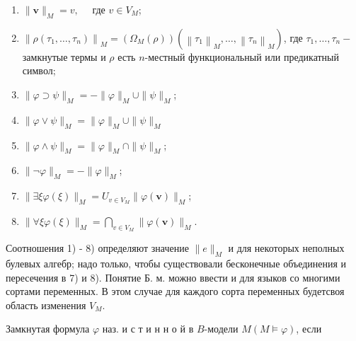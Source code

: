 \documentclass[10pt]{article}
\begin{document}
\begin{enumerate}

  \item $\|\boldsymbol{v}\|_{M}=v, \quad$ где $v \in V_{M}$;



  \item $\left\|\rho\left(\tau_{1}, \ldots, \tau_{n}\right)\right\|_{M}=\left(\Omega_{M}(\rho)\right)\left(\left\|\tau_{1}\right\|_{M}, \ldots,\left\|\tau_{n}\right\|_{M}\right)$, где $\tau_{1}, \ldots, \tau_{n}-$ замкнутые термы и $\rho$ есть $n$-местный функциональный или предикатный символ;



  \item $\|\varphi \supset \psi\|_{M}=-\|\varphi\|_{M} \cup\|\psi\|_{M}$;



  \item $\|\varphi \vee \psi\|_{M}=\|\varphi\|_{M} \cup\|\psi\|_{M}$



  \item $\|\varphi \wedge \psi\|_{M}=\|\varphi\|_{M} \cap\|\psi\|_{M}$;



  \item $\|\neg \varphi\|_{M}=-\|\varphi\|_{M}$;



  \item $\|\exists \xi \varphi(\xi)\|_{M}=U_{v \in V_{M}}\|\varphi(\boldsymbol{v})\|_{M}$;



  \item $\|\forall \xi \varphi(\xi)\|_{M}=\bigcap_{v \in V_{M}}\|\varphi(\boldsymbol{v})\|_{M}$.



\end{enumerate}



Соотношения 1) - 8) определяют значение $\|e\|_{M}$ и для некоторых неполных булевых алгебр; надо только, чтобы существовали бесконечные объединения и пересечения в 7) и 8). Понятие Б. м. можно ввести и для языков со многими сортами переменных. В этом случае для каждого сорта переменных будетсвоя область изменения $V_{M}$.



Замкнутая формула $\varphi$ наз. и с т и н н о й в $B$-модели $M(M \models \varphi)$, если
\end{document}
